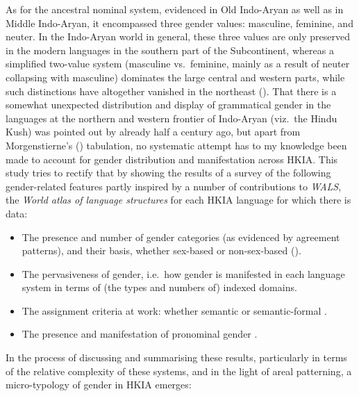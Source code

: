 \documentclass[output=collectionpaper]{langsci/langscibook}
\begin{document}
As for the ancestral nominal system, evidenced in Old Indo-Aryan as well as in Middle Indo-Aryan, it encompassed three gender values: masculine, feminine, and neuter. In the Indo-Aryan world in general, these three values are only preserved in the modern languages in the southern part of the Subcontinent, whereas a simplified two-value system (masculine vs.\ feminine, mainly as a result of neuter collapsing with masculine) dominates the large central and western parts, while such distinctions have altogether vanished in the northeast (\citealt[217--223]{Masica1991}). That there is a somewhat unexpected distribution and display of grammatical gender in the languages at the northern and western frontier of Indo-Aryan (viz.\ the Hindu Kush) was pointed out by \citet[68--71]{Emeneau1965} already half a century ago, but apart from Morgenstierne's (\citealt[19--20]{Morgenstierne1950}) tabulation, no systematic attempt has to my knowledge been made to account for gender distribution and manifestation across HKIA. This study tries to rectify that by showing the results of a survey of the following gender-related features \textendash{} partly inspired by a number of contributions to \textit{WALS}, the \textit{World atlas of language structures} \textendash{} for each HKIA language for which there is data:

\begin{itemize}
\item
The presence and number of gender categories (as evidenced by agreement patterns), and their basis, whether sex-based or non-sex-based (\citealt{Corbett2013,Corbett2013a}).
\item
The pervasiveness of gender, i.e.\ how gender is manifested in each language system in terms of (the types and numbers of) indexed domains.
\item
The assignment criteria at work: whether semantic or semantic-formal \citep{Corbett2013b}.
\item
The presence and manifestation of pronominal gender \citep{Siewierska2013}.
\end{itemize}

In the process of discussing and summarising these results, particularly in terms of the relative complexity of these systems, and in the light of areal patterning, a micro-typology of gender in HKIA emerges:
\end{document}
